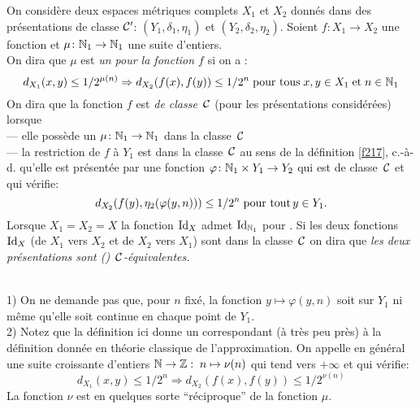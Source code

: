 \begin{fdefinition} \label{f221}
On considère deux espaces métriques complets  $X_1$  et  $X_2$  donnés 
dans  des présentations de classe  ${{\cal C}}'$:   $(Y_1,\delta_1,\eta_1)$  et  
$(Y_2,\delta_2,\eta_2).$  Soient  $f \colon  X_1 \rightarrow X_2 $  une fonction \unico 
et  $\mu \colon  \mathbb {N}_1 \rightarrow \mathbb {N}_1$ une suite d'entiers.\\ 
On dira que $\mu$ est {\em un \mcu pour la fonction   $f$}  si on a :  
$$d_{X_1}(x,y) \leq 1/2^{\mu(n)} \Rightarrow d_{X_2}(f(x),f(y)) \leq
1/2^n \; \hbox{pour tous} \; x, y \in X_1 \;\hbox{et}\; n \in \mathbb {N}_1$$
On dira que la fonction   $f$   est {\em \uni de classe}~${{\cal C}}$    (pour les 
présentations considérées) lorsque\\
--- elle possède un \mcu  $\mu \colon  \mathbb {N}_1  \rightarrow   \mathbb {N}_1$   dans la 
classe~${{\cal C}}$\\  
--- la restriction de  $f$  à  $Y_1$  est dans la classe~${{\cal C}}$   au sens de 
la définition \ref{f217}, c.-à-d. qu'elle est présentée par une fonction   
$\varphi\colon \mathbb {N}_1 \times Y_1 \rightarrow Y_2 $  qui est de classe~${{\cal C}}$   et qui 
vérifie:
$$d_{X_2}(f(y),\eta_2(\varphi(y,n))) \leq 1/2^n \; \hbox{pour tout}\,  y \in 
Y_1.$$	
Lorsque  $X_1 = X_2 =X$  la fonction  ${\rm Id}_X$  admet  ${\rm Id}_{\mathbb {N}_1}$  pour 
\mcu. Si les deux fonctions  ${\rm Id}_X$  (de  $X_1$  vers  $X_2$  et de  $X_2$  
vers  $X_1$)  sont dans la classe~${{\cal C}}$   on dira que {\em les deux 
présentations sont 
(\uniz)~${{\cal C}}$-équivalentes.}
\end{fdefinition}

\begin{fremarks}\label{f222}~\\
1)	On ne demande pas que, pour  $n$  fixé, la fonction  $y \mapsto
\varphi(y,n)$  soit \unico sur  $Y_1$  ni même qu'elle soit continue en chaque 
point de  $Y_1$.\\
2)	Notez que la définition ici donne un \mcu correspondant (à très peu 
près) à la définition donnée en  théorie 
classique de l'approximation. On appelle en général \mcu une suite croissante d'entiers  $\mathbb {N}\to\mathbb {Z}:\;n \mapsto \nu(n)$  qui tend vers $+\infty$ et qui vérifie:
\[
d_{X_1}(x,y) \leq 1/2^n \Rightarrow d_{X_2}(f(x),f(y)) \leq 1/2^{\nu(n)}
\]	
La fonction $\nu$ est en quelques sorte ``réciproque'' de la fonction $\mu$.
\end{fremarks}

